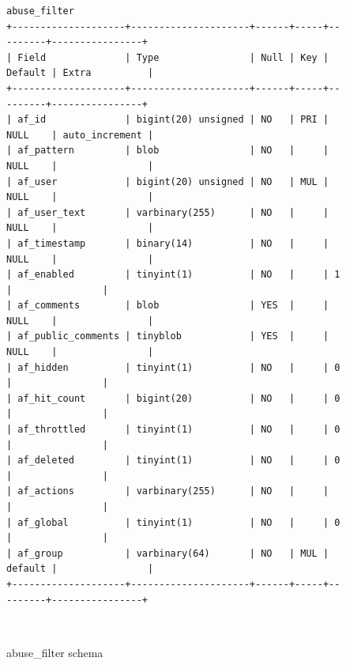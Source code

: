 \documentclass{sigchi}
\begin{document}
\begin{figure}
\begin{verbatim}
abuse_filter
+--------------------+---------------------+------+-----+---------+----------------+
| Field              | Type                | Null | Key | Default | Extra          |
+--------------------+---------------------+------+-----+---------+----------------+
| af_id              | bigint(20) unsigned | NO   | PRI | NULL    | auto_increment |
| af_pattern         | blob                | NO   |     | NULL    |                |
| af_user            | bigint(20) unsigned | NO   | MUL | NULL    |                |
| af_user_text       | varbinary(255)      | NO   |     | NULL    |                |
| af_timestamp       | binary(14)          | NO   |     | NULL    |                |
| af_enabled         | tinyint(1)          | NO   |     | 1       |                |
| af_comments        | blob                | YES  |     | NULL    |                |
| af_public_comments | tinyblob            | YES  |     | NULL    |                |
| af_hidden          | tinyint(1)          | NO   |     | 0       |                |
| af_hit_count       | bigint(20)          | NO   |     | 0       |                |
| af_throttled       | tinyint(1)          | NO   |     | 0       |                |
| af_deleted         | tinyint(1)          | NO   |     | 0       |                |
| af_actions         | varbinary(255)      | NO   |     |         |                |
| af_global          | tinyint(1)          | NO   |     | 0       |                |
| af_group           | varbinary(64)       | NO   | MUL | default |                |
+--------------------+---------------------+------+-----+---------+----------------+
\end{verbatim}
  \caption{abuse\_filter schema}~\label{fig:db-schemas-af}
\end{figure}
\end{document}
